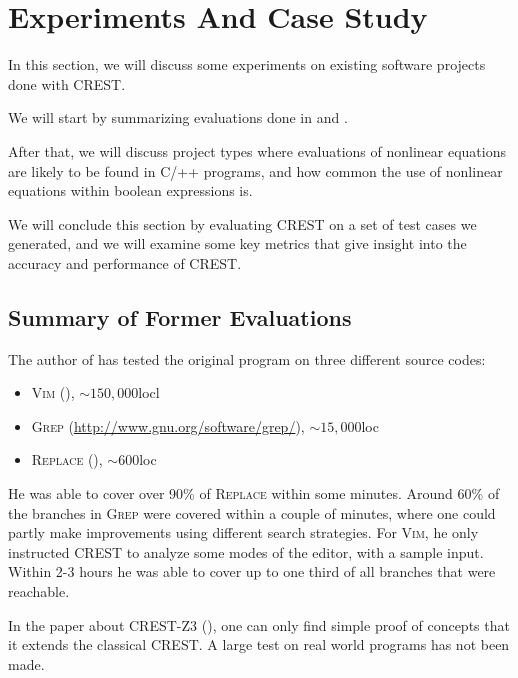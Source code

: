 \documentclass[oribibl, twocolumn]{llncs}
\begin{document}

\section{Experiments And Case Study}
\label{sctn:Experiments}

In this section, we will discuss some experiments on existing software
projects done with
\textsc{CREST}.

We will start by summarizing evaluations done in \cite{CREST} and
\cite{CRESTZ3}.

After that, we will discuss project types where evaluations of
nonlinear equations are likely to be found in \textsc{C/++} programs, and how common the use
of nonlinear equations within boolean expressions is.

We will conclude this section by evaluating CREST on a set of test cases we generated, and we will
examine some key metrics that give insight into the accuracy and performance of CREST.

\subsection{Summary of Former Evaluations}

The author of \cite{CREST} has tested the original program on three
different source codes:

\begin{itemize}
  \item \textsc{Vim} (\cite{oualline2001vi}), $\sim 150,000$locl
  \item \textsc{Grep} (\url{http://www.gnu.org/software/grep/}), $\sim
    15,000$loc
  \item \textsc{Replace} (\cite{harrold2010siemens}), $\sim 600$loc
\end{itemize}

He was able to cover over 90\% of \textsc{Replace} within some
minutes. Around 60\% of the branches in \textsc{Grep} were covered
within a couple of minutes, where one could partly make improvements
using different search strategies. For \textsc{Vim}, he only instructed \textsc{CREST} to analyze some modes of the editor, with a
sample input. Within 2-3 hours he was able to cover up to one third
of all branches that were reachable.

In the paper about \textsc{CREST-Z3} (\cite{CRESTZ3}), one can only
find simple proof of concepts that it extends the classical
\textsc{CREST}. A large test on real world programs has not been made.
\end{document}
